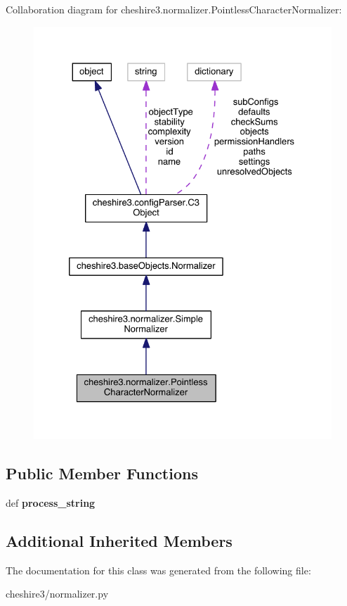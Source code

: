 Collaboration diagram for cheshire3.\-normalizer.\-Pointless\-Character\-Normalizer\-:
\nopagebreak
\begin{figure}[H]
\begin{center}
\leavevmode
\includegraphics[width=328pt]{classcheshire3_1_1normalizer_1_1_pointless_character_normalizer__coll__graph}
\end{center}
\end{figure}
\subsection*{Public Member Functions}
\begin{DoxyCompactItemize}
\item 
\hypertarget{classcheshire3_1_1normalizer_1_1_pointless_character_normalizer_a2d637fedbb258ae7e3914bf4e3848421}{def {\bfseries process\-\_\-string}}\label{classcheshire3_1_1normalizer_1_1_pointless_character_normalizer_a2d637fedbb258ae7e3914bf4e3848421}

\end{DoxyCompactItemize}
\subsection*{Additional Inherited Members}


The documentation for this class was generated from the following file\-:\begin{DoxyCompactItemize}
\item 
cheshire3/normalizer.\-py\end{DoxyCompactItemize}

